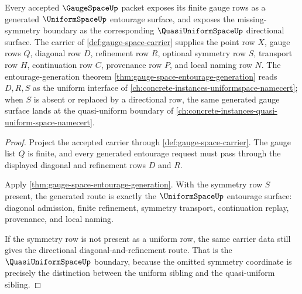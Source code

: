 \begin{theorem}
\label{thm:gauge-space-uniformspace-sibling-anchor}
Every accepted $\GaugeSpaceUp$ packet exposes its finite gauge rows as a generated $\UniformSpaceUp$ entourage surface, and exposes the missing-symmetry boundary as the corresponding $\QuasiUniformSpaceUp$ directional surface. The carrier of \autoref{def:gauge-space-carrier} supplies the point row $X$, gauge rows $Q$, diagonal row $D$, refinement row $R$, optional symmetry row $S$, transport row $H$, continuation row $C$, provenance row $P$, and local naming row $N$. The entourage-generation theorem \autoref{thm:gauge-space-entourage-generation} reads $D,R,S$ as the uniform interface of \autoref{ch:concrete-instances-uniformspace-namecert}; when $S$ is absent or replaced by a directional row, the same generated gauge surface lands at the quasi-uniform boundary of \autoref{ch:concrete-instances-quasi-uniform-space-namecert}.
\end{theorem}
\begin{proof}
Project the accepted carrier through \autoref{def:gauge-space-carrier}. The gauge list $Q$ is finite, and every generated entourage request must pass through the displayed diagonal and refinement rows $D$ and $R$.

Apply \autoref{thm:gauge-space-entourage-generation}. With the symmetry row $S$ present, the generated route is exactly the $\UniformSpaceUp$ entourage surface: diagonal admission, finite refinement, symmetry transport, continuation replay, provenance, and local naming.

If the symmetry row is not present as a uniform row, the same carrier data still gives the directional diagonal-and-refinement route. That is the $\QuasiUniformSpaceUp$ boundary, because the omitted symmetry coordinate is precisely the distinction between the uniform sibling and the quasi-uniform sibling.
\end{proof}
